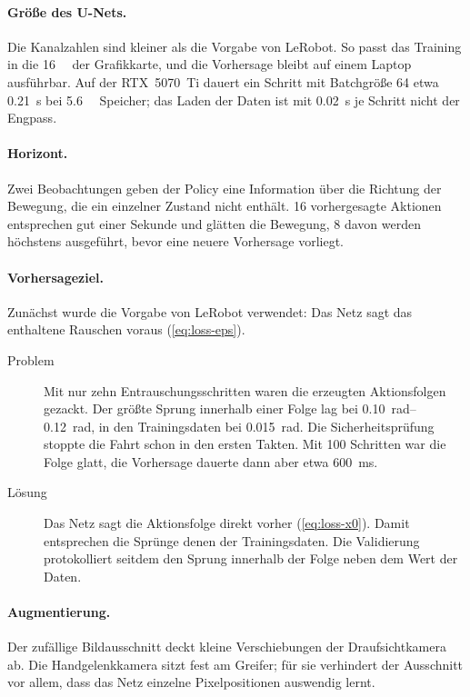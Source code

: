 \paragraph{Größe des U-Nets.} Die Kanalzahlen sind kleiner als die Vorgabe von LeRobot. So
passt das Training in die \SI{16}{\giga\byte} der Grafikkarte, und die Vorhersage bleibt auf
einem Laptop ausführbar. Auf der RTX~5070~Ti dauert ein Schritt mit Batchgröße 64 etwa
\SI{0.21}{\second} bei \SI{5.6}{\giga\byte} Speicher; das Laden der Daten ist mit
\SI{0.02}{\second} je Schritt nicht der Engpass.

\paragraph{Horizont.} Zwei Beobachtungen geben der Policy eine Information über die Richtung
der Bewegung, die ein einzelner Zustand nicht enthält. 16 vorhergesagte Aktionen entsprechen
gut einer Sekunde und glätten die Bewegung, 8 davon werden höchstens ausgeführt, bevor eine
neuere Vorhersage vorliegt.

\paragraph{Vorhersageziel.} Zunächst wurde die Vorgabe von LeRobot verwendet: Das Netz sagt
das enthaltene Rauschen voraus (\cref{eq:loss-eps}).
\begin{description}
  \item[Problem] Mit nur zehn Entrauschungsschritten waren die erzeugten Aktionsfolgen
    gezackt. Der größte Sprung innerhalb einer Folge lag bei \SIrange{0.10}{0.12}{rad},
    in den Trainingsdaten bei \SI{0.015}{rad}. Die Sicherheitsprüfung stoppte die Fahrt schon
    in den ersten Takten. Mit 100 Schritten war die Folge glatt, die Vorhersage dauerte dann
    aber etwa \SI{600}{\milli\second}.
  \item[Lösung] Das Netz sagt die Aktionsfolge direkt vorher (\cref{eq:loss-x0}). Damit
    entsprechen die Sprünge denen der Trainingsdaten. Die Validierung protokolliert seitdem
    den Sprung innerhalb der Folge neben dem Wert der Daten.
\end{description}

\paragraph{Augmentierung.} Der zufällige Bildausschnitt deckt kleine Verschiebungen der
Draufsichtkamera ab. Die Handgelenkkamera sitzt fest am Greifer; für sie verhindert der
Ausschnitt vor allem, dass das Netz einzelne Pixelpositionen auswendig lernt.


